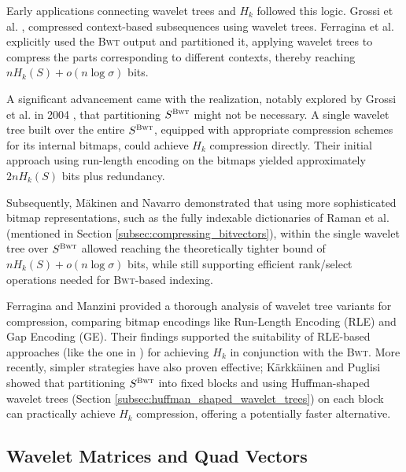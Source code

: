 Early applications connecting wavelet trees and $H_k$ followed this logic. Grossi et al. \cite{GrossiWT2003}, compressed context-based subsequences using wavelet trees. Ferragina et al. \cite{ferragina2004alphabet} explicitly used the \textsc{Bwt} output and partitioned it, applying wavelet trees to compress the parts corresponding to different contexts, thereby reaching $nH_k(S) + o(n \log \sigma)$ bits.

A significant advancement came with the realization, notably explored by Grossi et al. in 2004 \cite{grossi2004indexing}, that partitioning $S^{\textsc{Bwt}}$ might not be necessary. A single wavelet tree built over the entire $S^{\textsc{Bwt}}$, equipped with appropriate compression schemes for its internal bitmaps, could achieve $H_k$ compression directly. Their initial approach using run-length encoding on the bitmaps yielded approximately $2nH_k(S)$ bits plus redundancy.

Subsequently, Mäkinen and Navarro \cite{navarro2007compressed} demonstrated that using more sophisticated bitmap representations, such as the fully indexable dictionaries of Raman et al. \cite{RRR2002} (mentioned in Section \ref{subsec:compressing_bitvectors}), within the single wavelet tree over $S^{\textsc{Bwt}}$ allowed reaching the theoretically tighter bound of $nH_k(S) + o(n \log \sigma)$ bits, while still supporting efficient rank/select operations needed for \textsc{Bwt}-based indexing.

Ferragina and Manzini \cite{TheMyriadVirtuesWT} provided a thorough analysis of wavelet tree variants for compression, comparing bitmap encodings like Run-Length Encoding (RLE) and Gap Encoding (GE). Their findings supported the suitability of RLE-based approaches (like the one in \cite{grossi2004indexing}) for achieving $H_k$ in conjunction with the \textsc{Bwt}. More recently, simpler strategies have also proven effective; Kärkkäinen and Puglisi \cite{karkkainen2011fixed} showed that partitioning $S^{\textsc{Bwt}}$ into fixed blocks and using Huffman-shaped wavelet trees (Section \ref{subsec:huffman_shaped_wavelet_trees}) on each block can practically achieve $H_k$ compression, offering a potentially faster alternative.

\subsection{Wavelet Matrices and Quad Vectors} \label{sec:wavelet_matrices_and_quad_vectors}

